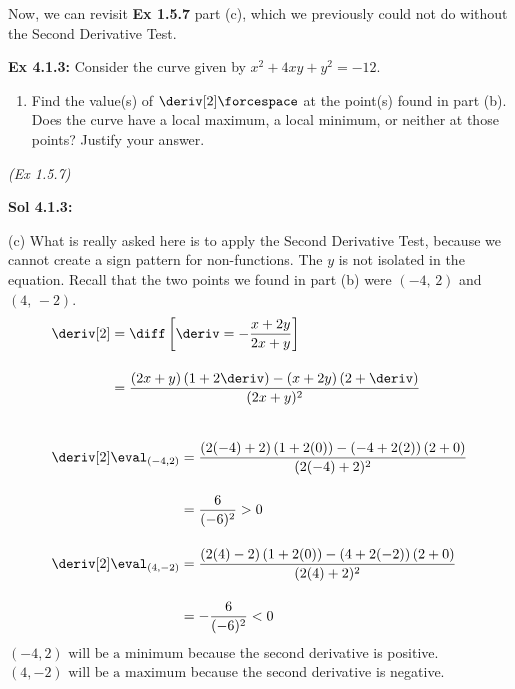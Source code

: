 Now, we can revisit \textbf{Ex 1.5.7} part (c), which we previously could not do without the Second Derivative Test. \par

\begin{tcolorbox}[example]
    \textbf{Ex 4.1.3: } Consider the curve given by $x^2 + 4xy + y^2 = -12$. \\
    \begin{enumerate}[label=\hspace{11pt}(\alph*), align=left, leftmargin=*, labelsep=0.25em, start=3]
        \item Find the value(s) of $\deriv[2] \forcespace$ at the point(s) found in part (b). Does the curve have a local maximum, a local minimum, or neither at those points? Justify your answer.
    \end{enumerate} \vspace{11pt}
    \footnotesize{\textit{(Ex 1.5.7)}}
\end{tcolorbox} 
\begin{tcolorbox}[solution]
    \textbf{Sol 4.1.3: } \par
    (c) What is really asked here is to apply the Second Derivative Test, because we cannot create a sign pattern for non-functions. The $y$ is not isolated in the equation. Recall that the two points we found in part (b) were $(-4, \, 2)$ and $(4, \, -2)$.\begin{align*}
        & \deriv[2] \begin{aligned}[t]
            & = \diff \left[\deriv = -\dfrac{x + 2y}{2x + y}\right] \\[11pt]
            & = \dfrac{(2x + y)\left(1 + 2\deriv\right) - (x + 2y)\left(2 + \deriv\right)}{(2x + y)^2} \\[11pt]
        \end{aligned} \\[11pt]
        & \deriv[2] \eval_{(-4, 2)} \begin{aligned}[t]
            & = \dfrac{(2(-4) + 2)\left(1 + 2(0)\right) - (-4 + 2(2))\left(2 + 0\right)}{(2(-4) + 2)^2} \\[11pt]
            & = \dfrac{6}{(-6)^2} > 0
        \end{aligned} \\[11pt]
        & \deriv[2] \eval_{(4, -2)} \begin{aligned}[t]
            & = \dfrac{(2(4) - 2)\left(1 + 2(0)\right) - (4 + 2(-2))\left(2 + 0\right)}{(2(4) + 2)^2} \\[11pt]
            & = -\dfrac{6}{(-6)^2} < 0
        \end{aligned}
    \end{align*}
    $\boxed{(-4, 2) \text{ will be a minimum}}$ because the second derivative is positive. \\[11pt]
    $\boxed{(4, -2) \text{ will be a maximum}}$ because the second derivative is negative.
\end{tcolorbox} \vspace{11pt}

